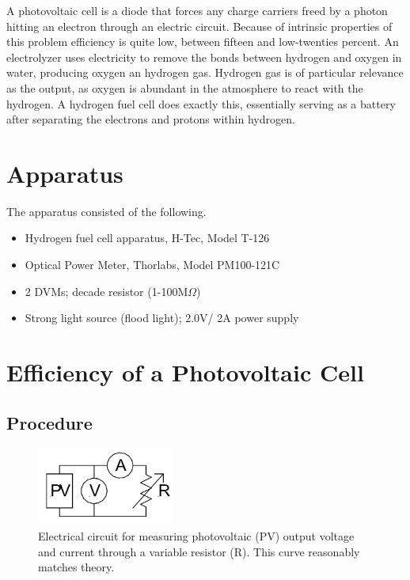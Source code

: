 \documentclass[aps,prl,reprint]{revtex4-2}
\begin{document}
A photovoltaic cell is a diode that forces any charge carriers freed by a photon hitting an electron through an electric 
circuit. Because of intrinsic properties of this problem efficiency is quite low, between fifteen and low-twenties percent.
An electrolyzer uses electricity to remove the bonds between hydrogen and oxygen in water, producing oxygen an hydrogen 
gas. Hydrogen gas is of particular relevance as the output, as oxygen is abundant in the atmosphere to react with the 
hydrogen. A hydrogen fuel cell does exactly this, essentially serving as a battery after separating the electrons and protons within hydrogen.

\section{Apparatus}

The apparatus consisted of the following.
\begin{itemize}
\item Hydrogen fuel cell apparatus, H-Tec, Model T-126
\item Optical Power Meter, Thorlabs, Model PM100-121C
\item 2 DVMs; decade resistor (1-100M$\Omega$)
\item Strong light source (flood light); 2.0V/ 2A power supply
\end{itemize}

\section{Efficiency of a Photovoltaic Cell}

\subsection{Procedure}

\begin{figure}[h]
\includegraphics[width=0.4\textwidth]{../Images/l1_PartA.jpg}
\caption{\label{figA}Electrical circuit for measuring photovoltaic (PV) output voltage and current through a variable resistor (R). This curve reasonably matches theory.}
\end{figure}
\end{document}
